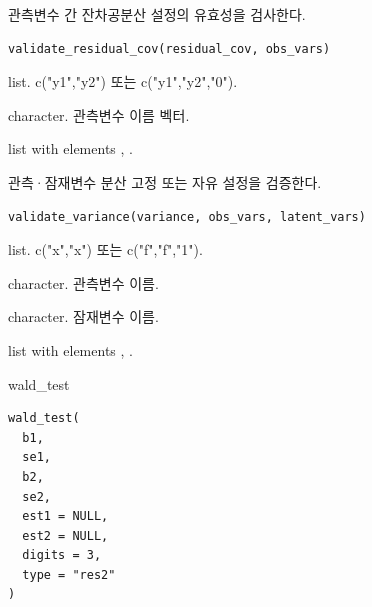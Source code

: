 \documentclass[a4paper]{book}
\begin{document}
\begin{Description}
관측변수 간 잔차공분산 설정의 유효성을 검사한다.
\end{Description}
%
\begin{Usage}
\begin{verbatim}
validate_residual_cov(residual_cov, obs_vars)
\end{verbatim}
\end{Usage}
%
\begin{Arguments}
\begin{ldescription}
\item[\code{residual\_cov}] list. c("y1","y2") 또는 c("y1","y2","0").

\item[\code{obs\_vars}] character. 관측변수 이름 벡터.
\end{ldescription}
\end{Arguments}
%
\begin{Value}
list with elements , .
\end{Value}
%
\begin{Description}
관측·잠재변수 분산 고정 또는 자유 설정을 검증한다.
\end{Description}
%
\begin{Usage}
\begin{verbatim}
validate_variance(variance, obs_vars, latent_vars)
\end{verbatim}
\end{Usage}
%
\begin{Arguments}
\begin{ldescription}
\item[\code{variance}] list. c("x","x") 또는 c("f","f","1").

\item[\code{obs\_vars}] character. 관측변수 이름.

\item[\code{latent\_vars}] character. 잠재변수 이름.
\end{ldescription}
\end{Arguments}
%
\begin{Value}
list with elements , .
\end{Value}
%
\begin{Description}
wald\_test
\end{Description}
%
\begin{Usage}
\begin{verbatim}
wald_test(
  b1,
  se1,
  b2,
  se2,
  est1 = NULL,
  est2 = NULL,
  digits = 3,
  type = "res2"
)
\end{verbatim}
\end{Usage}
\end{document}

